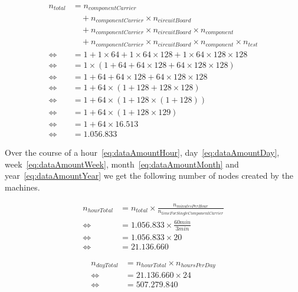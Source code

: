\begin{equation}
  \label{eq:dataAmount}
  \begin{aligned}
    n_{total} &= n_{componentCarrier} \\
    &\quad + n_{componentCarrier} \times n_{circuitBoard} \\
    &\quad + n_{componentCarrier} \times n_{circuitBoard} \times n_{component} \\
    &\quad + n_{componentCarrier} \times n_{circuitBoard} \times n_{component} \times n_{test} \\
    \iff &= 1 + 1 \times 64 + 1 \times 64 \times 128 + 1 \times 64 \times 128 \times 128 \\
    \iff &= 1 \times (1 + 64 + 64 \times 128 + 64 \times 128 \times 128) \\
    \iff &= 1 + 64 + 64 \times 128 + 64 \times 128 \times 128 \\
    \iff &= 1 + 64 \times (1 + 128 + 128 \times 128) \\
    \iff &= 1 + 64 \times (1 + 128 \times (1 + 128)) \\
    \iff &= 1 + 64 \times (1 + 128 \times 129) \\
    \iff &= 1 + 64 \times 16.513 \\
    \iff &= 1.056.833
  \end{aligned}
\end{equation}

Over the course of a hour~\ref{eq:dataAmountHour}, day~\ref{eq:dataAmountDay}, week~\ref{eq:dataAmountWeek}, month~\ref{eq:dataAmountMonth} and year~\ref{eq:dataAmountYear} we get the following number of nodes created by the machines.

\begin{equation}
  \label{eq:dataAmountHour}
  \begin{aligned}
      n_{hourTotal} &= n_{total} \times \frac{n_{minutesPerHour}}{n_{timeForSingleComponentCarrier}} \\
      \iff &= 1.056.833 \times \frac{60min}{3min} \\
      \iff &= 1.056.833 \times 20 \\
      \iff &= 21.136.660
  \end{aligned}
\end{equation}

\begin{equation}
  \label{eq:dataAmountDay}
  \begin{aligned}
      n_{dayTotal} &= n_{hourTotal} \times n_{hoursPerDay}\\
      \iff &= 21.136.660 \times 24 \\
      \iff &= 507.279.840
  \end{aligned}
\end{equation}

